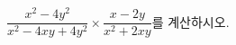 \hspace*{2mm}\begin{minipage}[t]{\dimexpr\linewidth-2mm\relax}\vspace{0pt}
$\dfrac{x^2-4y^2}{x^2-4xy+4y^2}\times\dfrac{x-2y}{x^2+2xy}$를 계산하시오.\end{minipage}

